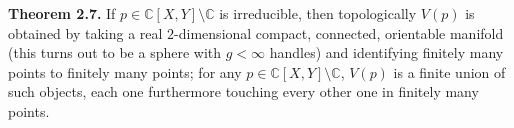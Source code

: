\textbf{Theorem 2.7.} If $p \in \mathbb{C}[X, Y] \setminus \mathbb{C}$ is irreducible, then topologically $V(p)$ is obtained by taking a real $2$-dimensional compact, connected, orientable manifold (this turns out to be a sphere with $g < \infty$ handles) and identifying finitely many points to finitely many points; for any $p \in \mathbb{C}[X, Y] \setminus \mathbb{C}$, $V(p)$ is a finite union of such objects, each one furthermore touching every other one in finitely many points.
